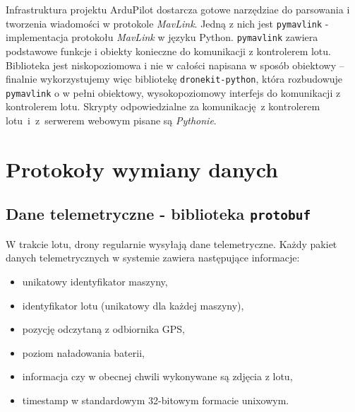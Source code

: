 Infrastruktura projektu ArduPilot dostarcza gotowe narzędziae do
parsowania i tworzenia wiadomości w protokole \textit{MavLink}.
Jedną z nich jest \texttt{pymavlink} - implementacja protokołu \textit{MavLink} 
w języku Python. \texttt{pymavlink} zawiera podstawowe funkcje i obiekty konieczne
do komunikacji z kontrolerem lotu. Biblioteka jest niskopoziomowa i nie w całości
napisana w sposób obiektowy -- finalnie wykorzystujemy więc bibliotekę
\texttt{dronekit-python}\cite{dronekit_python}, która rozbudowuje \texttt{pymavlink}
o w pełni obiektowy, wysokopoziomowy interfejs do komunikacji z kontrolerem lotu. 
Skrypty odpowiedzialne za komunikację~z kontrolerem lotu~i~z~serwerem webowym
pisane są \textit{Pythonie}.

\section{Protokoły wymiany danych}

\subsection{Dane telemetryczne - biblioteka \texttt{protobuf}} \label{protobuf_chapter}


W trakcie lotu, drony regularnie wysyłają dane telemetryczne. Każdy pakiet
danych telemetrycznych w systemie zawiera następujące informacje:
\begin{itemize}
	\item unikatowy identyfikator maszyny,
	\item identyfikator lotu (unikatowy dla każdej maszyny),
	\item pozycję odczytaną z odbiornika GPS,
	\item poziom naładowania baterii,
	\item informacja czy w obecnej chwili wykonywane są zdjęcia z lotu,
	\item timestamp w standardowym 32-bitowym formacie unixowym.
\end{itemize}


